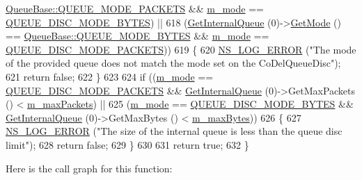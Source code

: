 \begin{DoxyCode}
      \hyperlink{classns3_1_1QueueBase_adc473162c2a2bcb3d76d151d6d7ee02aa68a809be7a09a4c4c7d8feb37f2f7a9d}{QueueBase::QUEUE\_MODE\_PACKETS} && \hyperlink{classns3_1_1CoDelQueueDisc_ab7948d66bebfcc5c1ac4e0d47636a068}{m\_mode} == 
      \hyperlink{classns3_1_1CoDelQueueDisc_a6149d83cd9f193b54b55efa7309b79ebaaae7bcc283fc6f666eb26c7d479d591a}{QUEUE\_DISC\_MODE\_BYTES}) ||
618       (\hyperlink{classns3_1_1QueueDisc_adf09b498c07c5677c26ea4b8309def74}{GetInternalQueue} (0)->\hyperlink{classns3_1_1CoDelQueueDisc_ab4e1b3733d0961c823b6fa7d2e36c0bb}{GetMode} () == 
      \hyperlink{classns3_1_1QueueBase_adc473162c2a2bcb3d76d151d6d7ee02aa141eeb76bf0704ba0fdb23b04ffc3453}{QueueBase::QUEUE\_MODE\_BYTES} && \hyperlink{classns3_1_1CoDelQueueDisc_ab7948d66bebfcc5c1ac4e0d47636a068}{m\_mode} == 
      \hyperlink{classns3_1_1CoDelQueueDisc_a6149d83cd9f193b54b55efa7309b79eba373e8cb28bf34e16cf0b9b1ed5aee5a0}{QUEUE\_DISC\_MODE\_PACKETS}))
619     \{
620       \hyperlink{group__logging_ga0261a8db1d4ac5f79417d117634fd455}{NS\_LOG\_ERROR} (\textcolor{stringliteral}{"The mode of the provided queue does not match the mode set on the
       CoDelQueueDisc"});
621       \textcolor{keywordflow}{return} \textcolor{keyword}{false};
622     \}
623 
624   \textcolor{keywordflow}{if} ((\hyperlink{classns3_1_1CoDelQueueDisc_ab7948d66bebfcc5c1ac4e0d47636a068}{m\_mode} ==  \hyperlink{classns3_1_1CoDelQueueDisc_a6149d83cd9f193b54b55efa7309b79eba373e8cb28bf34e16cf0b9b1ed5aee5a0}{QUEUE\_DISC\_MODE\_PACKETS} && 
      \hyperlink{classns3_1_1QueueDisc_adf09b498c07c5677c26ea4b8309def74}{GetInternalQueue} (0)->GetMaxPackets () < \hyperlink{classns3_1_1CoDelQueueDisc_a806f6d4be982deffa2369d21765ab7ae}{m\_maxPackets}) ||
625       (\hyperlink{classns3_1_1CoDelQueueDisc_ab7948d66bebfcc5c1ac4e0d47636a068}{m\_mode} ==  \hyperlink{classns3_1_1CoDelQueueDisc_a6149d83cd9f193b54b55efa7309b79ebaaae7bcc283fc6f666eb26c7d479d591a}{QUEUE\_DISC\_MODE\_BYTES} && 
      \hyperlink{classns3_1_1QueueDisc_adf09b498c07c5677c26ea4b8309def74}{GetInternalQueue} (0)->GetMaxBytes () < \hyperlink{classns3_1_1CoDelQueueDisc_aaedc40bf84fcee585be0e9cf3c98f33d}{m\_maxBytes}))
626     \{
627       \hyperlink{group__logging_ga0261a8db1d4ac5f79417d117634fd455}{NS\_LOG\_ERROR} (\textcolor{stringliteral}{"The size of the internal queue is less than the queue disc limit"});
628       \textcolor{keywordflow}{return} \textcolor{keyword}{false};
629     \}
630 
631   \textcolor{keywordflow}{return} \textcolor{keyword}{true};
632 \}
\end{DoxyCode}


Here is the call graph for this function\+:


